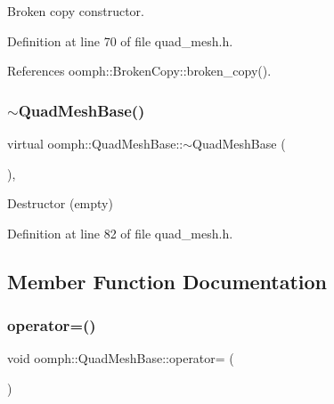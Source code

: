 Broken copy constructor. 



Definition at line 70 of file quad\+\_\+mesh.\+h.



References oomph\+::\+Broken\+Copy\+::broken\+\_\+copy().

\mbox{\label{classoomph_1_1QuadMeshBase_abffed544c2e94b255a5a69e66c13b4a0}} 
\subsubsection{\texorpdfstring{$\sim$\+Quad\+Mesh\+Base()}{~QuadMeshBase()}}
{\footnotesize\ttfamily virtual oomph\+::\+Quad\+Mesh\+Base\+::$\sim$\+Quad\+Mesh\+Base (\begin{DoxyParamCaption}{ }\end{DoxyParamCaption})\hspace{0.3cm}{\ttfamily [inline]}, {\ttfamily [virtual]}}



Destructor (empty) 



Definition at line 82 of file quad\+\_\+mesh.\+h.



\subsection{Member Function Documentation}
\mbox{\label{classoomph_1_1QuadMeshBase_ac8e97a828c6d6ccb2dd2e9acbf2f3571}} 
\subsubsection{\texorpdfstring{operator=()}{operator=()}}
{\footnotesize\ttfamily void oomph\+::\+Quad\+Mesh\+Base\+::operator= (\begin{DoxyParamCaption}\item[{const \hyperlink{classoomph_1_1QuadMeshBase}{Quad\+Mesh\+Base} \&}]{ }\end{DoxyParamCaption})\hspace{0.3cm}{\ttfamily [inline]}}



